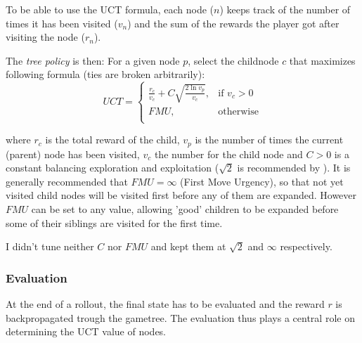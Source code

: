 To be able to use the UCT formula, each node ($n$) keeps track of the number of times it has been visited ($v_n$) and the sum of the rewards the player got after visiting the node ($r_n$).

The \textit{tree policy} is then:
For a given node $p$, select the childnode $c$ that maximizes following formula (ties are broken arbitrarily):
$$
UCT =
\begin{cases}
    \frac{r_c}{v_c} + C\sqrt{\frac{2\ln v_p}{v_c}}, & \text{if } v_c > 0 \\
    FMU, & \text{otherwise} \\
\end{cases}
$$

where $r_c$ is the total reward of the child, $v_p$ is the number of times the current (parent) node has been visited, $v_c$ the number for the child node and $C > 0$ is a constant balancing exploration and exploitation ($\sqrt{2}$ is recommended by \cite{ismcts}). \newline
It is generally recommended that $FMU = \infty$ (First Move Urgency), so that not yet visited child nodes will be visited first before any of them are expanded. However $FMU$ can be set to any value, allowing 'good' children to be expanded before some of their siblings are visited for the first time.

I didn't tune neither $C$ nor $FMU$ and kept them at $\sqrt{2}$ and $\infty$ respectively.


\subsubsection{Evaluation}
\label{sssec:evaluation}
At the end of a rollout, the final state has to be evaluated and the reward $r$ is backpropagated trough the gametree. The evaluation thus plays a central role on determining the UCT value of nodes.

